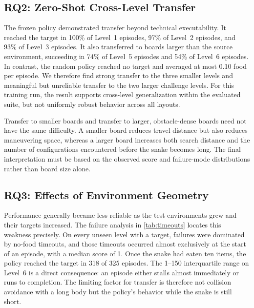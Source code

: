 \documentclass[journal]{IEEEtran}
\begin{document}
\subsection{RQ2: Zero-Shot Cross-Level Transfer}

The frozen policy demonstrated transfer beyond technical executability. It
reached the target in 100\% of Level~1 episodes, 97\% of Level~2 episodes, and
93\% of Level~3 episodes. It also transferred to boards larger than the source
environment, succeeding in 74\% of Level~5 episodes and 54\% of Level~6
episodes. In contrast, the random policy reached no target and averaged at most
0.10 food per episode. We therefore find strong transfer to the three smaller
levels and meaningful but unreliable transfer to the two larger challenge
levels. For this training run, the result supports cross-level generalization
within the evaluated suite, but not uniformly robust behavior across all
layouts.

Transfer to smaller boards and transfer to larger, obstacle-dense boards need
not have the same difficulty. A smaller board reduces travel distance but also
reduces maneuvering space, whereas a larger board increases both search distance
and the number of configurations encountered before the snake becomes long.
The final interpretation must be based on the observed score and failure-mode
distributions rather than board size alone.

\subsection{RQ3: Effects of Environment Geometry}

Performance generally became less reliable as the test environments grew and
their targets increased. The failure analysis in \cref{tab:timeouts} locates
this weakness precisely. On every unseen level with a target, failures were
dominated by no-food timeouts, and those timeouts occurred almost exclusively
at the start of an episode, with a median score of 1. Once the snake had eaten
ten items, the policy reached the target in 318 of 325 episodes. The 1--150
interquartile range on Level~6 is a direct consequence: an episode either
stalls almost immediately or runs to completion. The limiting factor for
transfer is therefore not collision avoidance with a long body but the
policy's behavior while the snake is still short.
\end{document}
